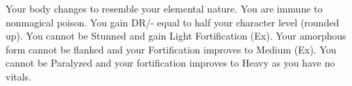 \combatfeat
{Your body changes to resemble your elemental nature.}
{You are immune to nonmagical poison.}
{You gain DR/- equal to half your character level (rounded up).}
{You cannot be Stunned and gain Light Fortification (Ex).}
{Your amorphous form cannot be flanked and your Fortification improves to Medium (Ex).}
{You cannot be Paralyzed and your fortification improves to Heavy as you have no vitals.}